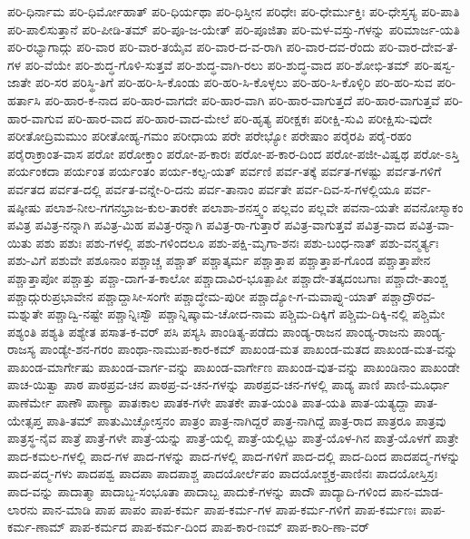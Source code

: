 {ಪರಿ-ಧಿರ್ನಾಮ
ಪರಿ-ಧಿರ್ಮೋಹಾತ್
ಪರಿ-ಧಿರ್ಯಥಾ
ಪರಿ-ಧಿಸ್ತೀನ
ಪರಿಧೇಃ
ಪರಿ-ಧೇರ್ಮುಕ್ತಿಃ
ಪರಿ-ಧೇಸ್ತಸ್ಯ
ಪರಿ-ಪಾತಿ
ಪರಿ-ಪಾಲಿಸುತ್ತಾನೆ
ಪರಿ-ಪೀಡಿ-ತಮ್
ಪರಿ-ಪೂ-ಜ-ಯೇತ್
ಪರಿ-ಪೂಜಿತಾ
ಪರಿ-ಮಳ-ವಸ್ತು-ಗಳನ್ನು
ಪರಿಮಾರ್ಜ-ಯತಿ
ಪರಿ-ರಭ್ಯಾಗಾದ್ಗು
ಪರಿ-ವಾರ
ಪರಿ-ವಾರ-ತಯೈವ
ಪರಿ-ವಾರ-ದ-ವ-ರಾಗಿ
ಪರಿ-ವಾರ-ದವ-ರೆಂದು
ಪರಿ-ವಾರ-ದೇವ-ತೆ-ಗಳ
ಪರಿ-ವೆಯೇ
ಪರಿ-ಶುದ್ಧ-ಗೊಳಿ-ಸುತ್ತವೆ
ಪರಿ-ಶುದ್ಧ-ವಾಗಿ-ರಲು
ಪರಿ-ಶುದ್ಧ-ವಾದ
ಪರಿ-ಶೋಭಿ-ತಮ್
ಪರಿ-ಷಸ್ವ-ಜಾತೇ
ಪರಿ-ಸರ
ಪರಿಸ್ಥಿ-ತಿಗೆ
ಪರಿ-ಹರಿ-ಸಿ-ಕೊಂಡು
ಪರಿ-ಹರಿ-ಸಿ-ಕೊಳ್ಳಲು
ಪರಿ-ಹರಿ-ಸಿ-ಕೊಳ್ಳಿರಿ
ಪರಿ-ಹರಿ-ಸುವ
ಪರಿ-ಹರ್ತಾಸಿ
ಪರಿ-ಹಾರ-ಕ-ನಾದ
ಪರಿ-ಹಾರ-ವಾಗದೇ
ಪರಿ-ಹಾರ-ವಾಗಿ
ಪರಿ-ಹಾರ-ವಾಗುತ್ತದೆ
ಪರಿ-ಹಾರ-ವಾಗುತ್ತವೆ
ಪರಿ-ಹಾರ-ವಾಗುವ
ಪರಿ-ಹಾರ-ವಾದ
ಪರಿ-ಹಾರ-ವಾದ-ಮೇಲೆ
ಪರಿ-ಹೃತ್ಯ
ಪರೀಕ್ಷಕಃ
ಪರೀಕ್ಷಿ-ಸುವಿ
ಪರೀಕ್ಷಿಸು-ವುದೇ
ಪರೀತೋದ್ರಿಮಮುಂ
ಪರೀತೋಹ್ಯ-ಗಮಂ
ಪರೀಧಾಯ
ಪರೇ
ಪರೇಭ್ಯೋ
ಪರೇಷಾಂ
ಪರೈರಪಿ
ಪರೈ-ರಹಂ
ಪರೈರಾಕ್ರಾಂತ-ವಾಸ
ಪರೋ
ಪರೋಕ್ತಾಂ
ಪರೋ-ಪ-ಕಾರಃ
ಪರೋ-ಪ-ಕಾರ-ದಿಂದ
ಪರೋ-ಪಜೀ-ವಿಷ್ವಥ
ಪರೋ-ಽಸ್ತಿ
ಪರ್ಯಂಕದಾ
ಪರ್ಯಂತ
ಪರ್ಯಂತಂ
ಪರ್ಯ-ಕಲ್ಪ-ಯತ್
ಪರ್ವಣಿ
ಪರ್ವ-ತಕ್ಕೆ
ಪರ್ವತ-ಗಳಷ್ಟು
ಪರ್ವತ-ಗಳಿಗೆ
ಪರ್ವತದ
ಪರ್ವತ-ದಲ್ಲಿ
ಪರ್ವತ-ವನ್ನೇ-ರಿ-ದನು
ಪರ್ವ-ತಾನಾಂ
ಪರ್ವತೇ
ಪರ್ವ-ದಿವ-ಸ-ಗಳಲ್ಲಿಯೂ
ಪರ್ವ-ಷಷ್ಠೀಷು
ಪಲಾಶ-ನೀಲ-ಗಗನಭ್ರಾಜ-ಕುಲ-ತಾರಕೇ
ಪಲಾಶಾ-ಶನಸ್ತ್ವಂ
ಪಲ್ಲವಂ
ಪಲ್ಲವೇ
ಪವನಾ-ಯತೇ
ಪವನೋಸ್ಮಾಕಂ
ಪವಿತ್ರ
ಪವಿತ್ರ-ನನ್ನಾಗಿ
ಪವಿತ್ರ-ಮಿಹ
ಪವಿತ್ರ-ರನ್ನಾಗಿ
ಪವಿತ್ರ-ರಾ-ಗುತ್ತಾರೆ
ಪವಿತ್ರ-ವಾಗುತ್ತವೆ
ಪವಿತ್ರ-ವಾದ
ಪವಿತ್ರ-ವಾ-ಯಿತು
ಪಶು
ಪಶುಃ
ಪಶು-ಗಳಲ್ಲಿ
ಪಶು-ಗಳಿಂದಲೂ
ಪಶು-ಪಕ್ಷಿ-ಮೃಗಾ-ಶನಃ
ಪಶು-ಬಂಧ-ನಾತ್
ಪಶು-ವನ್ಮರ್ತ್ಯಃ
ಪಶು-ವಿಗೆ
ಪಶುವೇ
ಪಶೂನಾಂ
ಪಶ್ಚಾಚ್ಚ
ಪಶ್ಚಾತ್
ಪಶ್ಚಾತ್ಕರ್ಮ
ಪಶ್ಚಾತ್ತಾಪ
ಪಶ್ಚಾತ್ತಾಪ-ಗೊಂಡ
ಪಶ್ಚಾತ್ತಾಪೇನ
ಪಶ್ಚಾತ್ತಾಪೋ
ಪಶ್ಚಾತ್ತು
ಪಶ್ಚಾ-ದಾಗ-ತ-ಕಾಲೋ
ಪಶ್ಚಾದಾವಿರ-ಭೂತ್ಪಾಪೀ
ಪಶ್ಚಾದೇ-ತತ್ಕದಂಬಗಾಃ
ಪಶ್ಚಾದೇ-ತಾಂಶ್ಚ
ಪಶ್ಚಾದ್ಗುರುಪ್ರಭಾವೇನ
ಪಶ್ಚಾದ್ದಾಸೀ-ಸಂಗೇ
ಪಶ್ಚಾದ್ಧೇಮ-ಪುರೀ
ಪಶ್ಚಾದ್ಯೋ-ಗ-ಮವಾಪ್ನು-ಯಾತ್
ಪಶ್ಚಾದ್ರೌರವ-ಮಶ್ನುತೇ
ಪಶ್ಚಾದ್ವಿ-ನಷ್ಟೇ
ಪಶ್ಚಾನ್ನಿಃಸ್ವೌ
ಪಶ್ಚಾನ್ನಿಷ್ಕಾಮ-ಚೋದ-ನಾಮ
ಪಶ್ಚಿಮ-ದಿಕ್ಕಿಗೆ
ಪಶ್ಚಿಮ-ದಿಕ್ಕಿ-ನಲ್ಲಿ
ಪಶ್ಚಿಮೇ
ಪಶ್ಯಂತಿ
ಪಶ್ಯತಿ
ಪಶ್ಯೇತ
ಪಸಾತ-ಕ-ವರ್
ಪಸಿ
ಪಸ್ಯಸಿ
ಪಾಂಡಿತ್ಯ-ಪಡೆದು
ಪಾಂಡ್ಯ-ರಾಜನ
ಪಾಂಡ್ಯ-ರಾಜನು
ಪಾಂಡ್ಯ-ರಾಜಸ್ಯ
ಪಾಂಡ್ಯೇ-ಶನ-ಗರಂ
ಪಾಂಥಾ-ನಾಮುಪ-ಕಾರ-ಕಮ್
ಪಾಖಂಡ-ಮತ
ಪಾಖಂಡ-ಮತದ
ಪಾಖಂಡ-ಮತ-ವನ್ನು
ಪಾಖಂಡ-ಮಾರ್ಗೇಷು
ಪಾಖಂಡ-ವಾರ್ಗ-ವನ್ನು
ಪಾಖಂಡ-ವಾರ್ಗೇಣ
ಪಾಖಂಡ-ವುತ-ವನ್ನು
ಪಾಖಂಡಿನಾಂ
ಪಾಖಂಡೇ
ಪಾಚ-ಯಿತ್ವಾ
ಪಾಠ
ಪಾಠಪ್ರವ-ಚನ
ಪಾಠಪ್ರ-ವ-ಚನ-ಗಳನ್ನು
ಪಾಠಪ್ರವ-ಚನ-ಗಳಲ್ಲಿ
ಪಾಡ್ಯ
ಪಾಣಿ
ಪಾಣಿ-ಮೂರ್ಧಾ
ಪಾಣೆರ್ಮೇ
ಪಾಣೌ
ಪಾಣ್ಯಾ
ಪಾತಃಕಾಲ
ಪಾತಕ-ಗಳೇ
ಪಾತಕೇ
ಪಾತ-ಯಂತಿ
ಪಾತ-ಯತಿ
ಪಾತ-ಯತ್ಯದ್ದಾ
ಪಾತ-ಯೇತ್ಸಪ್ತ
ಪಾತಿ-ತಮ್
ಪಾತುಮಿಚ್ಛೋಸ್ತನಂ
ಪಾತ್ರಂ
ಪಾತ್ರ-ನಾಗಿದ್ದರೆ
ಪಾತ್ರ-ನಾಗಿದ್ದೆ
ಪಾತ್ರ-ರಾದ
ಪಾತ್ರರೂ
ಪಾತ್ರವು
ಪಾತ್ರಸ್ಥ-ನೈವ
ಪಾತ್ರೆ
ಪಾತ್ರೆ-ಗಳೇ
ಪಾತ್ರೆ-ಯನ್ನು
ಪಾತ್ರೆ-ಯಲ್ಲಿ
ಪಾತ್ರೆ-ಯಲ್ಲಿಟ್ಟು
ಪಾತ್ರೆ-ಯೊಳ-ಗಿನ
ಪಾತ್ರೆ-ಯೊಳಗೆ
ಪಾತ್ರೇ
ಪಾದ-ಕಮಲ-ಗಳಲ್ಲಿ
ಪಾದ-ಗಳ
ಪಾದ-ಗಳನ್ನು
ಪಾದ-ಗಳಲ್ಲಿ
ಪಾದ-ಗಳಿಗೆ
ಪಾದ-ದಲ್ಲಿ
ಪಾದ-ದಿಂದ
ಪಾದಪದ್ಮ-ಗಳನ್ನು
ಪಾದ-ಪದ್ಮ-ಗಳು
ಪಾದಪಶ್ವ
ಪಾದಪಾ
ಪಾದಪಾಶ್ಚ
ಪಾದಯೋರ್ಲೆಪಂ
ಪಾದಯೋಶ್ಚಕ್ರ-ಪಾಣಿನಃ
ಪಾದಯೋಸ್ತಿಸ್ರಃ
ಪಾದ-ವನ್ನು
ಪಾದಾತ್ಮಾ
ಪಾದಾಬ್ಜ-ಸಂಭೂತಾ
ಪಾದಾಬ್ಬ
ಪಾದುಕೆ-ಗಳನ್ನು
ಪಾದೌ
ಪಾದ್ಯಾದಿ-ಗಳಿಂದ
ಪಾನ-ಮಾಡ-ಲಾರನು
ಪಾನ-ಮಾಡಿ
ಪಾಪ
ಪಾಪಂ
ಪಾಪ-ಕರ್ಮ
ಪಾಪ-ಕರ್ಮ-ಗಳ
ಪಾಪ-ಕರ್ಮ-ಗಳಿಗೆ
ಪಾಪ-ಕರ್ಮಣಃ
ಪಾಪ-ಕರ್ಮ-ಣಾಮ್
ಪಾಪ-ಕರ್ಮದ
ಪಾಪ-ಕರ್ಮ-ದಿಂದ
ಪಾಪ-ಕಾರ-ಣಮ್
ಪಾಪ-ಕಾರಿ-ಣಾ-ವರ್
}
